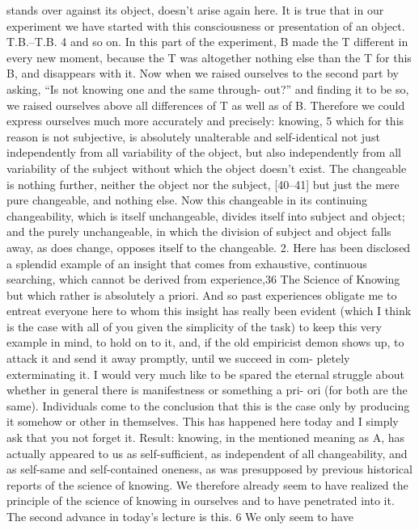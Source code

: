 stands over against its object, doesn’t arise again here. It is true that in our
experiment we have started with this consciousness or presentation of an
object. T.B.–T.B. 4 and so on. In this part of the experiment, B made the T
different in every new moment, because the T was altogether nothing else
than the T for this B, and disappears with it. Now when we raised ourselves
to the second part by asking, “Is not knowing one and the same through-
out?” and finding it to be so, we raised ourselves above all differences of T
as well as of B. Therefore we could express ourselves much more accurately
and precisely: knowing, 5 which for this reason is not subjective, is
absolutely unalterable and self-identical not just independently from all
variability of the object, but also independently from all variability of the
subject without which the object doesn’t exist. The changeable is nothing
further, neither the object nor the subject, [40–41] but just the mere pure
changeable, and nothing else. Now this changeable in its continuing
changeability, which is itself unchangeable, divides itself into subject and
object; and the purely unchangeable, in which the division of subject and
object falls away, as does change, opposes itself to the changeable.
2. Here has been disclosed a splendid example of an insight that comes from
exhaustive, continuous searching, which cannot be derived from experience,36
The Science of Knowing
but which rather is absolutely a priori. And so past experiences obligate me
to entreat everyone here to whom this insight has really been evident (which
I think is the case with all of you given the simplicity of the task) to keep
this very example in mind, to hold on to it, and, if the old empiricist demon
shows up, to attack it and send it away promptly, until we succeed in com-
pletely exterminating it. I would very much like to be spared the eternal
struggle about whether in general there is manifestness or something a pri-
ori (for both are the same). Individuals come to the conclusion that this is
the case only by producing it somehow or other in themselves. This has
happened here today and I simply ask that you not forget it.
Result: knowing, in the mentioned meaning as A, has actually appeared
to us as self-sufficient, as independent of all changeability, and as self-same and
self-contained oneness, as was presupposed by previous historical reports of the
science of knowing. We therefore already seem to have realized the principle of
the science of knowing in ourselves and to have penetrated into it.
The second advance in today’s lecture is this. 6 We only seem to have
